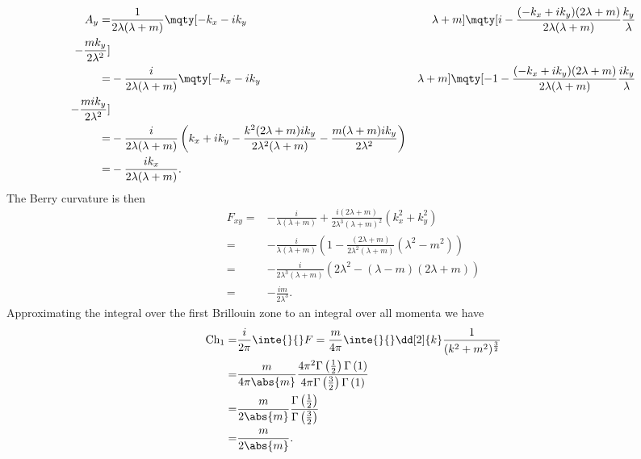 \begin{align*}
	A_{y} =& \frac{1}{2\lambda(\lambda + m)}\mqty[
		-k_{x} - ik_{y} & \lambda + m
	]\mqty[
		i - \frac{(-k_{x} + ik_{y})(2\lambda + m)}{2\lambda(\lambda + m)}\frac{k_{y}}{\lambda} \\
		-\frac{mk_{y}}{2\lambda^{2}}
	] \\
	=& -\frac{i}{2\lambda(\lambda + m)}\mqty[
		-k_{x} - ik_{y} & \lambda + m
	]\mqty[
		-1 - \frac{(-k_{x} + ik_{y})(2\lambda + m)}{2\lambda(\lambda + m)}\frac{ik_{y}}{\lambda} \\
		-\frac{mik_{y}}{2\lambda^{2}}
	] \\
	=& -\frac{i}{2\lambda(\lambda + m)}\left(k_{x} + ik_{y} - \frac{k^{2}(2\lambda + m)ik_{y}}{2\lambda^{2}(\lambda + m)} - \frac{m(\lambda + m)ik_{y}}{2\lambda^{2}}\right) \\
	=& -\frac{ik_{x}}{2\lambda(\lambda + m)}.
\end{align*}
The Berry curvature is then
\begin{align*}
	F_{xy} =& -\frac{i}{\lambda(\lambda + m)} + \frac{i(2\lambda + m)}{2\lambda^{3}(\lambda + m)^{2}}(k_{x}^{2} + k_{y}^{2}) \\
	       =& -\frac{i}{\lambda(\lambda + m)}\left(1 - \frac{(2\lambda + m)}{2\lambda^{2}(\lambda + m)}(\lambda^{2} - m^{2})\right) \\
	       =& -\frac{i}{2\lambda^{3}(\lambda + m)}\left(2\lambda^{2} - (\lambda - m)(2\lambda + m)\right) \\
	       =& -\frac{im}{2\lambda^{3}}.
\end{align*}
Approximating the integral over the first Brillouin zone to an integral over all momenta we have
\begin{align*}
	\text{Ch}_{1} =& \frac{i}{2\pi}\inte{}{}F = \frac{m}{4\pi}\inte{}{}\dd[2]{k}\frac{1}{(k^{2} + m^{2})^{\frac{3}{2}}} \\
	              =& \frac{m}{4\pi\abs{m}}\frac{4\pi^{2}\Gamma\left(\frac{1}{2}\right)\Gamma\left(1\right)}{4\pi\Gamma\left(\frac{3}{2}\right)\Gamma\left(1\right)} \\
	              =& \frac{m}{2\abs{m}}\frac{\Gamma\left(\frac{1}{2}\right)}{\Gamma\left(\frac{3}{2}\right)} \\
	              =& \frac{m}{2\abs{m}}.
\end{align*}

